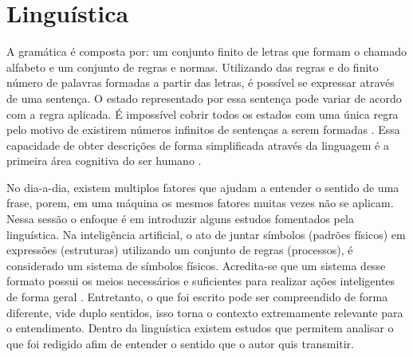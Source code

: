 \section{Linguística}
A gramática é composta por: um conjunto finito de letras que formam o chamado alfabeto e um conjunto de regras e normas. Utilizando das regras e do finito número de palavras formadas a partir das letras, é possível se expressar através de uma sentença. O estado representado por essa sentença pode variar de acordo com a regra aplicada. É impossível cobrir todos os estados com uma única regra pelo motivo de existirem números infinitos de sentenças a serem formadas \cite[13-25]{chomsky2002syntactic}. Essa capacidade de obter descrições de forma simplificada através da linguagem é a primeira área cognitiva do ser humano \cite[131]{putnam1975mind}.

No dia-a-dia, existem multiplos fatores que ajudam a entender o sentido de uma frase, porem, em uma máquina os mesmos fatores muitas vezes não se aplicam. Nessa sessão o enfoque é em introduzir alguns estudos fomentados pela linguística. Na inteligência artificial, o ato de juntar símbolos (padrões físicos) em expressões (estruturas) utilizando um conjunto de regras (processos), é considerado um sistema de símbolos físicos. Acredita-se que um sistema desse formato possui os meios necessários e suficientes para realizar ações inteligentes de forma geral \cite[116]{newell1976ComputerSA}. Entretanto, o que foi escrito pode ser compreendido de forma diferente, vide duplo sentidos, isso torna o contexto extremamente relevante para o entendimento. Dentro da linguística existem estudos que permitem analisar o que foi redigido afim de entender o sentido que o autor quis transmitir.



